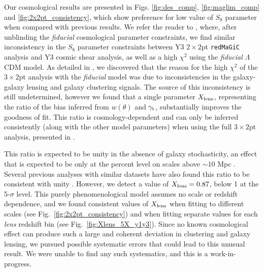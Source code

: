 \documentclass[aps, prd,twocolumn,superscriptaddress,nofootinbib,preprintnumbers]{revtex4-1}
\newcommand{\redmagic}{\texttt{redMaGiC} }
\begin{document}
Our cosmological results are presented in Figs. \ref{fig:des_comp}, \ref{fig:maglim_comp} and \ref{fig:2x2pt_consistency}, which show preference for low value of $S_8$ parameter when compared with previous results. We refer the reader to \citet{y3-3x2ptkp}, where, after unblinding the \textit{fiducial} cosmological parameter constraints, we find similar inconsistency in the $S_8$ parameter constraints between Y3 $2\times2$pt \redmagic analysis and Y3 cosmic shear analysis, as well as a high $\chi^2$ using the \textit{fiducial} $\Lambda$CDM model. As detailed in \citet{y3-3x2ptkp}, we discovered that the reason for the high $\chi^2$ of the $3\times2$pt analysis with the \textit{fiducial} model was due to inconsistencies in the galaxy-galaxy lensing and galaxy clustering signals. The source of this inconsistency is still undetermined, however we found that a single parameter $X_{\rm lens}$, representing the ratio of the bias inferred from $w(\theta)$ and $\gamma_{\rm t}$, substantially improves the goodness of fit. This ratio is cosmology-dependent and can only be inferred consistently (along with the other model parameters)  when using the full $3\times2$pt analysis, presented in \citet*{y3-3x2ptkp}.


This ratio is expected to be unity in the absence of galaxy stochasticity, an effect that is expected to be only at the percent level on scales above $\sim 10$ Mpc \citep{Desjacques_2018}. Several previous analyses with similar datasets have also found this ratio to be consistent with unity \citep{Mandelbaum_2013, Cacciato_2012, gglpaper}. However, we detect a value of $X_{\rm lens}=0.87$, below 1 at the 5-$\sigma$ level. This purely phenomenological model assumes no scale or redshift dependence, and we found consistent values of $X_{\rm lens}$ when fitting to different scales (see Fig.~\ref{fig:2x2pt_consistency}) and when fitting separate values for each \emph{lens} redshift bin (see Fig.~\ref{fig:Xlens_5X_y1y3}). 
Since no known cosmological effect can produce such a large and coherent deviation in clustering and galaxy lensing, we pursued possible systematic errors that could lead to this unusual result. 
We were unable to find any such systematics, and this is a work-in-progress.  
\end{document}
